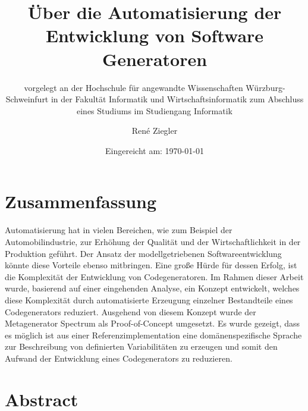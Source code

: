 \documentclass[12pt,oneside,a4paper,parskip]{scrbook}
\def\BaAuthor{René Ziegler}
\def\BaTitle{Über die Automatisierung der Entwicklung von Software Generatoren}
\def\BaSupervisorOne{Prof.\ Dr.\ Peter Braun}
\def\BaSupervisorTwo{M.Sc. Tobias Fertig}
\def\BaDeadline{\today}
\begin{document}


\frontmatter
\titlehead{%
  {Hochschule für angewandte Wissenschaften Würzburg-Schweinfurt\\
   Fakultät Informatik und Wirtschaftsinformatik}}
\subject{Bachelorarbeit}
\title{\BaTitle\\[15mm]}
\subtitle{\normalsize{vorgelegt an der Hochschule f\"{u}r angewandte Wissenschaften W\"{u}rzburg-Schweinfurt in der Fakult\"{a}t Informatik und Wirtschaftsinformatik zum Abschluss eines Studiums im Studiengang Informatik}}
\author{\BaAuthor}
\date{\normalsize{Eingereicht am: \BaDeadline}}
\publishers{
  \normalsize{Erstpr\"{u}fer: \BaSupervisorOne}\\
  \normalsize{Zweitpr\"{u}fer: \BaSupervisorTwo}\\
}


\maketitle



\section*{Zusammenfassung}

Automatisierung hat in vielen Bereichen, wie zum Beispiel der Automobilindustrie, zur Erhöhung der Qualität und der Wirtschaftlichkeit in der Produktion geführt. Der Ansatz der modellgetriebenen Softwareentwicklung könnte diese Vorteile ebenso mitbringen. Eine große Hürde für dessen Erfolg, ist die Komplexität der Entwicklung von Codegeneratoren. Im Rahmen dieser Arbeit wurde, basierend auf einer eingehenden Analyse, ein Konzept entwickelt, welches diese Komplexität durch automatisierte Erzeugung einzelner Bestandteile eines Codegenerators reduziert. Ausgehend von diesem Konzept wurde der Metagenerator Spectrum als Proof-of-Concept umgesetzt. Es wurde gezeigt, dass es möglich ist aus einer Referenzimplementation eine domänenspezifische Sprache zur Beschreibung von definierten Variabilitäten zu erzeugen und somit den Aufwand der Entwicklung eines Codegenerators zu reduzieren.

\section*{Abstract}
\end{document}
